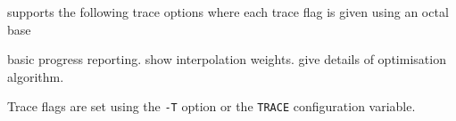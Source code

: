 
 supports the following trace options where each
trace flag is given using an octal base
\begin{optlist}
    basic progress reporting.
    show interpolation weights.
    give details of optimisation algorithm.
\end{optlist}
Trace flags are set using the \texttt{-T} option or the  \texttt{TRACE} 
configuration variable.


